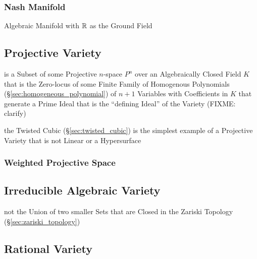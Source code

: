 \subsubsection{Nash Manifold}\label{sec:nash_manifold}

Algebraic Manifold with $\mathbb{R}$ as the Ground Field



\subsection{Projective Variety}\label{sec:projective_variety}

is a Subset of some Projective $n$-space $\xspace{P}^n$ over an Algebraically
Closed Field $K$ that is the Zero-locus of some Finite Family of Homogenous
Polynomials (\S\ref{sec:homogeneous_polynomial}) of $n + 1$ Variables with
Coefficients in $K$ that generate a Prime Ideal that is the ``defining Ideal''
of the Variety (FIXME: clarify)

the Twisted Cubic (\S\ref{sec:twisted_cubic}) is the simplest example of a
Projective Variety that is not Linear or a Hypersurface



\subsubsection{Weighted Projective Space}\label{sec:weighted_projective_space}



\subsection{Irreducible Algebraic Variety}
\label{sec:irreducible_algebraic_variety}

not the Union of two smaller Sets that are Closed in the Zariski Topology
(\S\ref{sec:zariski_topology})



\subsection{Rational Variety}\label{sec:rational_variety}

